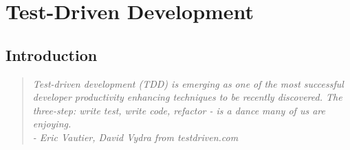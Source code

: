 \section{Test-Driven Development}
\subsection{Introduction}
\begin{quote}
\textit{Test-driven development (TDD) is emerging as one of the most successful
developer productivity enhancing techniques to be recently discovered. The
three-step: write test, write code, refactor - is a dance many of us are
enjoying. \\
  - Eric Vautier, David Vydra from testdriven.com}
\end{quote}

